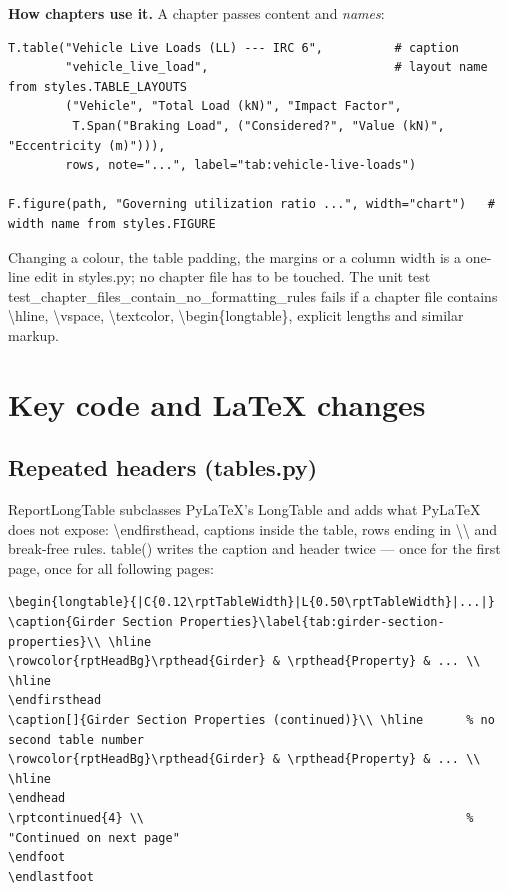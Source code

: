 \documentclass[10pt,a4paper]{article}
\newcommand{\file}[1]{{\footnotesize\ttfamily #1}}
\newcommand{\code}[1]{{\small\ttfamily #1}}
\newenvironment{codeblock}{\par\small\begingroup}{\endgroup\par}
\begin{document}
\textbf{How chapters use it.} A chapter passes content and \emph{names}:

\begin{codeblock}
\begin{verbatim}
T.table("Vehicle Live Loads (LL) --- IRC 6",          # caption
        "vehicle_live_load",                          # layout name from styles.TABLE_LAYOUTS
        ("Vehicle", "Total Load (kN)", "Impact Factor",
         T.Span("Braking Load", ("Considered?", "Value (kN)", "Eccentricity (m)"))),
        rows, note="...", label="tab:vehicle-live-loads")

F.figure(path, "Governing utilization ratio ...", width="chart")   # width name from styles.FIGURE
\end{verbatim}
\end{codeblock}

Changing a colour, the table padding, the margins or a column width is a one-line edit in \file{styles.py}; no chapter file has to be touched. The unit test \code{test\_chapter\_files\_contain\_no\_formatting\_rules} fails if a chapter file contains \code{\textbackslash hline}, \code{\textbackslash vspace}, \code{\textbackslash textcolor}, \code{\textbackslash begin\{longtable\}}, explicit lengths and similar markup.

\section{Key code and LaTeX changes}

\subsection{Repeated headers (\file{tables.py})}

\code{ReportLongTable} subclasses PyLaTeX's \code{LongTable} and adds what PyLaTeX does not expose: \code{\textbackslash endfirsthead}, captions inside the table, rows ending in \code{\textbackslash\textbackslash*} and break-free rules. \code{table()} writes the caption and header twice --- once for the first page, once for all following pages:

\begin{codeblock}
\begin{verbatim}
\begin{longtable}{|C{0.12\rptTableWidth}|L{0.50\rptTableWidth}|...|}
\caption{Girder Section Properties}\label{tab:girder-section-properties}\\ \hline
\rowcolor{rptHeadBg}\rpthead{Girder} & \rpthead{Property} & ... \\ \hline
\endfirsthead
\caption[]{Girder Section Properties (continued)}\\ \hline      % no second table number
\rowcolor{rptHeadBg}\rpthead{Girder} & \rpthead{Property} & ... \\ \hline
\endhead
\rptcontinued{4} \\                                             % "Continued on next page"
\endfoot
\endlastfoot
\end{verbatim}
\end{codeblock}
\end{document}
